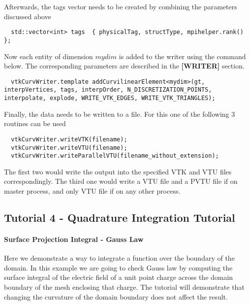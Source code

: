 \noindent
Afterwards, the tags vector needs to be created by combining the parameters discussed above

\begin{mybox}
\begin{lstlisting}
  std::vector<int> tags  { physicalTag, structType, mpihelper.rank() };
\end{lstlisting}
\end{mybox}

\noindent
Now each entity of dimension $mydim$ is added to the writer using the command below. The corresponding parameters are described in the \textbf{[WRITER]} section. \\

\begin{mybox}
\begin{lstlisting}
  vtkCurvWriter.template addCurvilinearElement<mydim>(gt, interpVertices, tags, interpOrder, N_DISCRETIZATION_POINTS, interpolate, explode, WRITE_VTK_EDGES, WRITE_VTK_TRIANGLES);
\end{lstlisting}
\end{mybox}

\noindent
Finally, the data needs to be written to a file. For this one of the following 3 routines can be used \\

\begin{mybox}
\begin{lstlisting}
  vtkCurvWriter.writeVTK(filename);
  vtkCurvWriter.writeVTU(filename);
  vtkCurvWriter.writeParallelVTU(filename_without_extension);
\end{lstlisting}
\end{mybox}

\noindent
The first two would write the output into the specified VTK and VTU files correspondingly. The third one would write a VTU file and a PVTU file if on master process, and only VTU file if on any other process.




\subsection{Tutorial 4 - Quadrature Integration Tutorial}
\label{usage-howto-tutorial-integration-quadrature}

\paragraph{Surface Projection Integral - Gauss Law}
Here we demonstrate a way to integrate a function over the boundary of the domain. In this example we are going to check Gauss law by computing the surface integral of the electric field of a unit point charge across the domain boundary of the mesh enclosing that charge. The tutorial will demonstrate that changing the curvature of the domain boundary does not affect the result. \\


